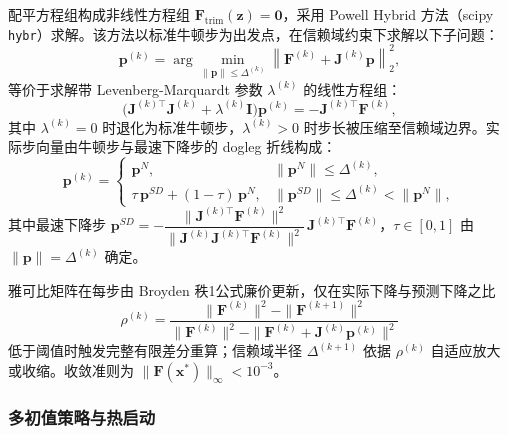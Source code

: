 配平方程组构成非线性方程组 $\mathbf{F}_{\mathrm{trim}}(\mathbf{z}) = \mathbf{0}$，采用 Powell Hybrid 方法（scipy \texttt{hybr}）求解。该方法以标准牛顿步为出发点，在信赖域约束下求解以下子问题：
\begin{equation}
\mathbf{p}^{(k)} = \arg\min_{\|\mathbf{p}\| \leq \Delta^{(k)}} \left\| \mathbf{F}^{(k)} + \mathbf{J}^{(k)}\mathbf{p} \right\|_2^2,
\end{equation}
等价于求解带 Levenberg-Marquardt 参数 $\lambda^{(k)}$ 的线性方程组：
\begin{equation}
\bigl(\mathbf{J}^{(k)\top}\mathbf{J}^{(k)} + \lambda^{(k)}\mathbf{I}\bigr)\mathbf{p}^{(k)} = -\mathbf{J}^{(k)\top}\mathbf{F}^{(k)},
\end{equation}
其中 $\lambda^{(k)} = 0$ 时退化为标准牛顿步，$\lambda^{(k)} > 0$ 时步长被压缩至信赖域边界。实际步向量由牛顿步与最速下降步的 dogleg 折线构成：
\begin{equation}
\mathbf{p}^{(k)} =
\begin{cases}
\mathbf{p}^N, & \|\mathbf{p}^N\| \leq \Delta^{(k)}, \\[4pt]
\tau\,\mathbf{p}^{SD} + (1-\tau)\,\mathbf{p}^N, & \|\mathbf{p}^{SD}\| \leq \Delta^{(k)} < \|\mathbf{p}^N\|,
\end{cases}
\end{equation}
其中最速下降步 $\mathbf{p}^{SD} = -\dfrac{\|\mathbf{J}^{(k)\top}\mathbf{F}^{(k)}\|^2}{\|\mathbf{J}^{(k)}\mathbf{J}^{(k)\top}\mathbf{F}^{(k)}\|^2}\,\mathbf{J}^{(k)\top}\mathbf{F}^{(k)}$，$\tau \in [0,1]$ 由 $\|\mathbf{p}\| = \Delta^{(k)}$ 确定。

雅可比矩阵在每步由 Broyden 秩1公式廉价更新，仅在实际下降与预测下降之比
\begin{equation}
\rho^{(k)} = \frac{\|\mathbf{F}^{(k)}\|^2 - \|\mathbf{F}^{(k+1)}\|^2}{\|\mathbf{F}^{(k)}\|^2 - \|\mathbf{F}^{(k)} + \mathbf{J}^{(k)}\mathbf{p}^{(k)}\|^2}
\end{equation}
低于阈值时触发完整有限差分重算；信赖域半径 $\Delta^{(k+1)}$ 依据 $\rho^{(k)}$ 自适应放大或收缩。收敛准则为 $\|\mathbf{F}(\mathbf{x}^*)\|_\infty < 10^{-3}$。

\subsubsection{多初值策略与热启动}

